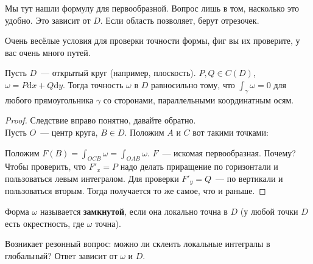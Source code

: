 \documentclass{article}
\begin{document}
    \begin{remark}
        Мы тут нашли формулу для первообразной. Вопрос лишь в том, насколько это удобно. Это зависит от $D$. Если область позволяет, берут отрезочек.
    \end{remark}
    \begin{remark}
        Очень весёлые условия для проверки точности формы, фиг вы их проверите, у вас очень много путей.
    \end{remark}
    \begin{lemma}
        Пусть $D$~--- открытый круг (например, плоскость). $P,Q\in C(D)$, $\omega=P\mathrm dx+Q\mathrm dy$. Тогда точность $\omega$ в $D$ равносильно тому, что $\int_\gamma\omega=0$ для любого прямоугольника $\gamma$ со сторонами, параллельными координатным осям. 
    \end{lemma}
    \begin{proof}
        Следствие вправо понятно, давайте обратно.\\
        Пусть $O$~--- центр круга, $B\in D$. Положим $A$ и $C$ вот такими точками:
        \begin{figure}[H]
        \end{figure}\noindent
        Положим $F(B)=\int_{OCB}\omega=\int_{OAB}\omega$. $F$~--- искомая первообразная. Почему? Чтобы проверить, что $F'_x=P$ надо делать приращение по горизонтали и пользоваться левым интегралом. Для проверки $F'_y=Q$~--- по вертикали и пользоваться вторым. Тогда получается то же самое, что и раньше.
    \end{proof}
    \begin{definition}
        Форма $\omega$ называется \textbf{замкнутой}, если она локально точна в $D$ (у любой точки $D$ есть окрестность, где $\omega$ точна).
    \end{definition}
    \begin{remark}
        Возникает резонный вопрос: можно ли склеить локальные интегралы в глобальный? Ответ зависит от $\omega$ и $D$.
    \end{remark}
\end{document}

